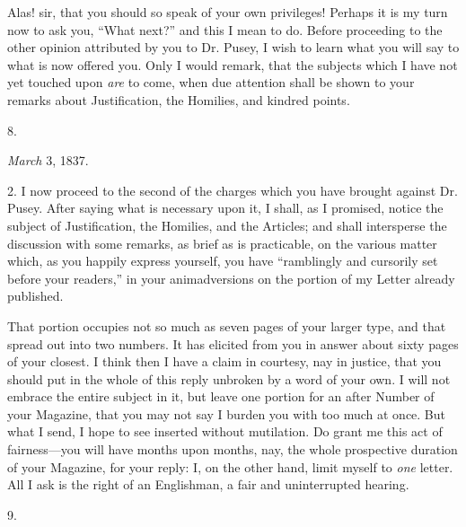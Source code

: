 Alas! sir, that you should so speak of your own
privileges! Perhaps it is my turn now to ask you, ``What next?'' and
this I mean to do. Before proceeding to the other opinion
attributed by you to Dr. Pusey, I wish to learn what you will say to
what is now offered you. Only I would remark, that the subjects which
I have not yet touched upon \emph{are} to come, when due attention
shall be shown to your remarks about Justification, the Homilies, and
kindred points.


8.

\emph{March} 3, 1837.

2. I now proceed to the second of the charges which you have brought
against Dr. Pusey. After saying what is necessary upon it, I shall, as
I promised, notice the subject of Justification, the Homilies, and the
Articles; and shall intersperse the discussion with some remarks, as
brief as is practicable, on the various matter which, as you happily
express yourself, you have ``ramblingly and cursorily set before your
readers,'' in your animadversions on the portion of my Letter already
published.

That portion occupies not so much as seven pages
of your larger type, and that spread out into two numbers. It has
elicited from you in answer about sixty pages of your closest. I think
then I have a claim in courtesy, nay in justice, that you should put
in the whole of this reply unbroken by a word of your own. I will not
embrace the entire subject in it, but leave one portion for an after
Number of your Magazine, that you may not say I burden you with too
much at once. But what I send, I hope to see inserted without
mutilation. Do grant me this act of fairness—you will have months
upon months, nay, the whole prospective duration of your Magazine, for
your reply: I, on the other hand, limit myself to \emph{one} letter.
All I ask is the right of an Englishman, a fair and
uninterrupted hearing.

9.

